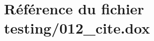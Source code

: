 \hypertarget{012__cite_8dox}{}\section{Référence du fichier testing/012\+\_\+cite.dox}
\label{012__cite_8dox}
